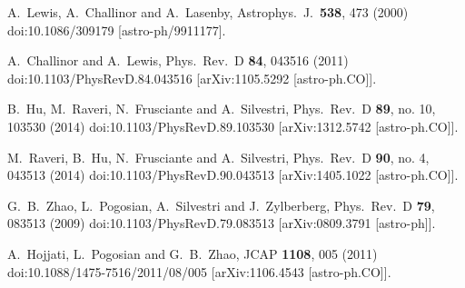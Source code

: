 \documentclass[prd,nofootinbib,showpacs]{revtex4}
\begin{document}

\begin{thebibliography}{99}\footnotesize

  A.~Lewis, A.~Challinor and A.~Lasenby,
  Astrophys.\ J.\  {\bf 538}, 473 (2000)
  doi:10.1086/309179
  [astro-ph/9911177].

  A.~Challinor and A.~Lewis,
  Phys.\ Rev.\ D {\bf 84}, 043516 (2011)
  doi:10.1103/PhysRevD.84.043516
  [arXiv:1105.5292 [astro-ph.CO]].

  B.~Hu, M.~Raveri, N.~Frusciante and A.~Silvestri,
  Phys.\ Rev.\ D {\bf 89}, no. 10, 103530 (2014)
  doi:10.1103/PhysRevD.89.103530
  [arXiv:1312.5742 [astro-ph.CO]].
  
  M.~Raveri, B.~Hu, N.~Frusciante and A.~Silvestri,
  Phys.\ Rev.\ D {\bf 90}, no. 4, 043513 (2014)
  doi:10.1103/PhysRevD.90.043513
  [arXiv:1405.1022 [astro-ph.CO]].
  
  G.~B.~Zhao, L.~Pogosian, A.~Silvestri and J.~Zylberberg,
  Phys.\ Rev.\ D {\bf 79}, 083513 (2009)
  doi:10.1103/PhysRevD.79.083513
  [arXiv:0809.3791 [astro-ph]].
  
  A.~Hojjati, L.~Pogosian and G.~B.~Zhao,
  JCAP {\bf 1108}, 005 (2011)
  doi:10.1088/1475-7516/2011/08/005
  [arXiv:1106.4543 [astro-ph.CO]].


\end{thebibliography}
\end{document}
